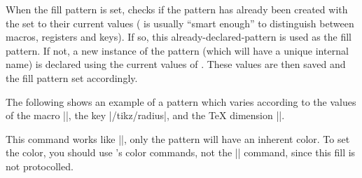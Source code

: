 \begin{command}{\pgfdeclarepatternformonly%
	}
  When the fill pattern is set, \pgfname{} checks if the pattern has
  already been created with the  set to their current
  values (\pgfname{} is usually ``smart enough'' to distinguish between
  macros, registers and keys). If so, this already-declared-pattern
  is used as the fill pattern.
  If not, a new instance of the pattern (which will have a
  unique internal name) is declared using the current values of
  . These values are then saved and the fill pattern
  set accordingly.
	
	The following shows an example of a pattern which varies
	according to the values of the macro |\size|, the key |/tikz/radius|,
	and the \TeX{} dimension |\thickness|.

\begin{codeexample}[]
{}
{}
{\pgfpoint{\size}{\size}}
{
  \pgfsetlinewidth{\thickness}
  \pgfpathcircle{}
}
\newdimen\thickness
{}
\end{codeexample}
\end{command}


\begin{command}{\pgfdeclarepatterninherentlycolored
    }
  This command works like |\pgfdeclarepatternuncolored|, only the
  pattern will have an inherent color. To set the color, you should
  use \pgfname's color commands, not the |\color| command, since this
  fill is not protocolled.

\begin{codeexample}[]
{\pgfpointorigin}{\pgfpoint{1cm}{1cm}}
{\pgfpoint{1cm}{1cm}}
{
  \pgftransformshift{\pgfpoint{.5cm}{.5cm}}
  \pgfpathclose%
}
\end{codeexample}
\end{command}




